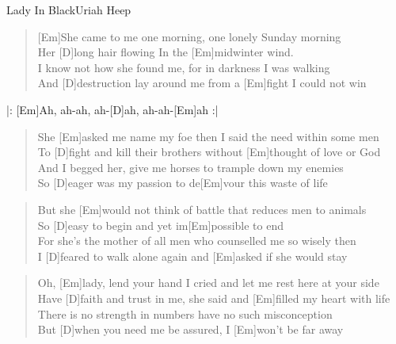 \begin{song}{Lady In Black}{Uriah Heep}

    \begin{verse}  
        [Em]She came to me one morning, one lonely Sunday morning \\
        Her [D]long hair flowing In the [Em]midwinter wind. \\
        I know not how she found me, for in darkness I was walking \\
        And [D]destruction lay around me from a [Em]fight I could not win \\
    \end{verse}  

    \begin{chorus}
        |: [Em]Ah, ah-ah, ah-[D]ah, ah-ah-[Em]ah :|
    \end{chorus}

    \begin{verse}  
        She [Em]asked me name my foe then I said the need within some men \\
        To [D]fight and kill their brothers without [Em]thought of love or God \\
        And I begged her, give me horses to trample down my enemies \\
        So [D]eager was my passion to de[Em]vour this waste of life
    \end{verse}  


    \begin{verse}  
        But she [Em]would not think of battle that reduces men to animals \\
        So [D]easy to begin and yet im[Em]possible to end \\
        For she's the mother of all men who counselled me so wisely then \\
        I [D]feared to walk alone again and [Em]asked if she would stay
    \end{verse}  


    \begin{verse}  
        Oh, [Em]lady, lend your hand I cried and let me rest here at your side \\
        Have [D]faith and trust in me, she said and [Em]filled my heart with life \\
        There is no strength in numbers have no such misconception \\
        But [D]when you need me be assured, I [Em]won't be far away
    \end{verse}  


\end{song}
